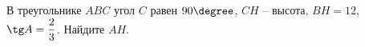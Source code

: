 \begin{ex}
	\begin{condition}
		В треугольнике \( ABC \) угол \( C \) равен \( 90\degree \), \( CH  \) – высота, \( BH = 12 \),  \( \tg A = \dfrac{2}{3} \). Найдите \( AH \).
	\end{condition}
\end{ex}